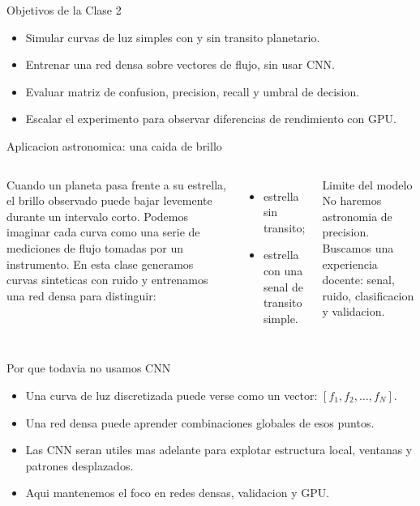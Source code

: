 \begin{frame}{Objetivos de la Clase 2}
\begin{itemize}
    \item Simular curvas de luz simples con y sin transito planetario.
    \item Entrenar una red densa sobre vectores de flujo, sin usar CNN.
    \item Evaluar matriz de confusion, precision, recall y umbral de decision.
    \item Escalar el experimento para observar diferencias de rendimiento con GPU.
\end{itemize}
\end{frame}

\begin{frame}{Aplicacion astronomica: una caida de brillo}
\begin{columns}[T,onlytextwidth]
\justifying
Cuando un planeta pasa frente a su estrella, el brillo observado puede bajar levemente durante un intervalo corto. Podemos imaginar cada curva como una serie de mediciones de flujo tomadas por un instrumento. En esta clase generamos curvas sinteticas con ruido y entrenamos una red densa para distinguir:
\begin{itemize}
    \item estrella sin transito;
    \item estrella con una senal de transito simple.
\end{itemize}

\begin{alertblock}{Limite del modelo}
No haremos astronomia de precision. Buscamos una experiencia docente: senal, ruido, clasificacion y validacion.
\end{alertblock}

\centering
\resizebox{0.96\linewidth}{!}{}
\end{columns}
\end{frame}

\begin{frame}{Por que todavia no usamos CNN}
\begin{itemize}
    \item Una curva de luz discretizada puede verse como un vector: $[f_1,f_2,\ldots,f_N]$.
    \item Una red densa puede aprender combinaciones globales de esos puntos.
    \item Las CNN seran utiles mas adelante para explotar estructura local, ventanas y patrones desplazados.
    \item Aqui mantenemos el foco en redes densas, validacion y GPU.
\end{itemize}
\end{frame}


